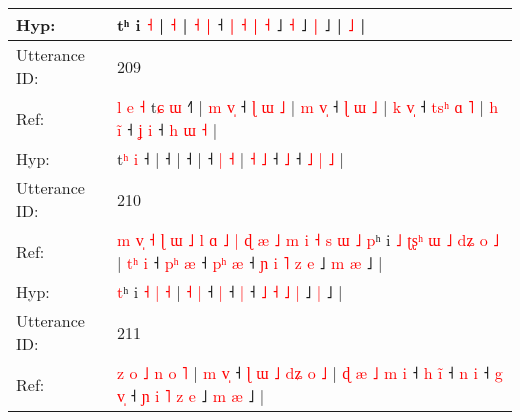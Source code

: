 \documentclass[10pt]{article}
\DeclareRobustCommand{\hl}[1]{{\textcolor{red}{#1}}}
\begin{document}
\begin{longtable}{ll}
 \\
Hyp: & \hl{}\hl{}\hl{}\hl{}\hl{}\hl{}\hl{}\hl{}\hl{}\hl{}\hl{}\hl{}\hl{}\hl{}\hl{}\hl{}\hl{}\hl{}\hl{}\hl{}\hl{}\hl{}\hl{}\hl{}\hl{}\hl{}\hl{}\hl{}\hl{}\hl{}\hl{}\hl{}\hl{}\hl{}\hl{}\hl{}\hl{}\hl{}\hl{}tʰ i \hl{}\hl{˧} |\hl{}\hl{}\hl{} \hl{}\hl{˧} |\hl{}\hl{}\hl{}\hl{}\hl{}\hl{} \hl{˧} \hl{|} ˧\hl{}\hl{} \hl{|} \hl{˧} \hl{}\hl{|} \hl{˧} ˩ \hl{}\hl{˧} ˩\hl{}\hl{} \hl{|} ˩ |\hl{}\hl{}\hl{}\hl{}\hl{}\hl{}\hl{}\hl{}\hl{}\hl{}\hl{} \hl{}\hl{˩} |
 \\
\midrule
Utterance ID: & 209 \\
Ref: & \hl{l}\hl{ }\hl{e}\hl{ }\hl{˧}\hl{ }t\hl{ɕ} \hl{ɯ} ˧\hl{˥} |\hl{ }\hl{m}\hl{ }\hl{v}\hl{̩} ˧\hl{ }\hl{ɭ}\hl{ }\hl{ɯ}\hl{ }\hl{˩} |\hl{ }\hl{m}\hl{ }\hl{v}\hl{̩} ˧\hl{ }\hl{ɭ}\hl{ }\hl{ɯ}\hl{ }\hl{˩} |\hl{ }\hl{k}\hl{ }\hl{v}\hl{̩} ˧\hl{ }\hl{t}\hl{s}\hl{ʰ} \hl{ɑ} \hl{˥} | \hl{h} \hl{i}\hl{̃} ˧\hl{ }\hl{ʝ} \hl{i} ˧ \hl{h} \hl{ɯ} \hl{˧} |
 \\
Hyp: & \hl{}\hl{}\hl{}\hl{}\hl{}\hl{}t\hl{ʰ} \hl{i} ˧\hl{} |\hl{}\hl{}\hl{}\hl{}\hl{} ˧\hl{}\hl{}\hl{}\hl{}\hl{}\hl{} |\hl{}\hl{}\hl{}\hl{}\hl{} ˧\hl{}\hl{}\hl{}\hl{}\hl{}\hl{} |\hl{}\hl{}\hl{}\hl{}\hl{} ˧\hl{}\hl{}\hl{}\hl{} \hl{|} \hl{˧} | \hl{˧} \hl{}\hl{˩} ˧\hl{}\hl{} \hl{˩} ˧ \hl{˩} \hl{|} \hl{˩} |
 \\
\midrule
Utterance ID: & 210 \\
Ref: & \hl{m}\hl{ }\hl{v}\hl{̩}\hl{ }\hl{˧}\hl{ }\hl{ɭ}\hl{ }\hl{ɯ}\hl{ }\hl{˩}\hl{ }\hl{l}\hl{ }\hl{ɑ}\hl{ }\hl{˩}\hl{ }\hl{|}\hl{ }\hl{ɖ}\hl{ }\hl{æ}\hl{ }\hl{˩}\hl{ }\hl{m}\hl{ }\hl{i}\hl{ }\hl{˧}\hl{ }\hl{s}\hl{ }\hl{ɯ}\hl{ }\hl{˩}\hl{ }\hl{p}ʰ i\hl{ }\hl{˩}\hl{ }\hl{ʈ}\hl{ʂ}\hl{ʰ}\hl{ }\hl{ɯ}\hl{ }\hl{˩} \hl{d}\hl{ʑ} \hl{o} \hl{˩} | \hl{t}\hl{ʰ} \hl{i} ˧\hl{ }\hl{p}\hl{ʰ} \hl{æ} ˧\hl{ }\hl{p}\hl{ʰ} \hl{æ} ˧\hl{ }\hl{ɲ} \hl{i} \hl{˥} \hl{z} \hl{e} ˩\hl{ }\hl{m} \hl{æ} ˩ |
 \\
Hyp: & \hl{}\hl{}\hl{}\hl{}\hl{}\hl{}\hl{}\hl{}\hl{}\hl{}\hl{}\hl{}\hl{}\hl{}\hl{}\hl{}\hl{}\hl{}\hl{}\hl{}\hl{}\hl{}\hl{}\hl{}\hl{}\hl{}\hl{}\hl{}\hl{}\hl{}\hl{}\hl{}\hl{}\hl{}\hl{}\hl{}\hl{}\hl{}\hl{}\hl{t}ʰ i\hl{}\hl{}\hl{}\hl{}\hl{}\hl{}\hl{}\hl{}\hl{}\hl{} \hl{}\hl{˧} \hl{|} \hl{˧} | \hl{}\hl{˧} \hl{|} ˧\hl{}\hl{}\hl{} \hl{|} ˧\hl{}\hl{}\hl{} \hl{|} ˧\hl{}\hl{} \hl{˩} \hl{˧} \hl{˩} \hl{|} ˩\hl{}\hl{} \hl{|} ˩ |
 \\
\midrule
Utterance ID: & 211 \\
Ref: & \hl{z}\hl{ }\hl{o}\hl{ }\hl{˩}\hl{ }\hl{n} \hl{o} \hl{˥} |\hl{ }\hl{m}\hl{ }\hl{v}\hl{̩} ˧\hl{ }\hl{ɭ}\hl{ }\hl{ɯ}\hl{ }\hl{˩}\hl{ }\hl{d}\hl{ʑ}\hl{ }\hl{o}\hl{ }\hl{˩} |\hl{ }\hl{ɖ} \hl{æ} \hl{˩} \hl{m} \hl{i} ˧\hl{ }\hl{h} \hl{i}\hl{̃} ˧\hl{ }\hl{n} \hl{i} ˧\hl{ }\hl{g} \hl{v}\hl{̩} ˧\hl{ }\hl{ɲ} \hl{i} \hl{˥} \hl{z} \hl{e} ˩\hl{ }\hl{m} \hl{æ} ˩ |

\end{longtable}
\end{document}
